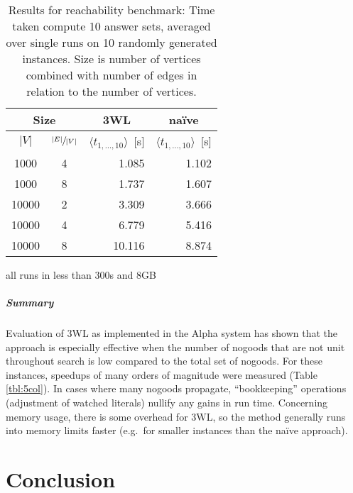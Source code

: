 \documentclass{vutinfth} %
\begin{document}
\begin{table}
	\begin{center}
	\begin{tabular}{|cc||r|r|}
\hline
\multicolumn{2}{|c||}{Size} & \multicolumn{1}{c|}{3WL} & \multicolumn{1}{c|}{na\"{i}ve} \\ 
\hline
$|V|$ & $\sfrac{|E|}{|V|}$& $\langle t_{1, \ldots, 10} \rangle$~[s]& $\langle t_{1, \ldots, 10} \rangle$~[s]\\
\hline
\hline
 1000 & 4 & 	  1.085 &	  1.102 \\
 1000 & 8 & 	  1.737 &	  1.607 \\
10000 & 2 & 	  3.309 &	  3.666 \\
10000 & 4 & 	  6.779 &	  5.416 \\
10000 & 8 & 	 10.116 &	  8.874 \\
\hline
	\end{tabular}

\hspace{3mm}

all runs in less than 300s and 8GB
	\end{center}
	\caption[Results for reachability benchmark]{Results for reachability benchmark: Time taken compute 10 answer sets, averaged over single runs on 10 randomly generated instances. Size is number of vertices combined with number of edges in relation to the number of vertices.}
	\label{tbl:reach}
\end{table}

\paragraph{Summary} Evaluation of 3WL as implemented in the Alpha system has shown that the approach is especially effective when the number of nogoods that are not unit throughout search is low compared to the total set of nogoods. For these instances, speedups of many orders of magnitude were measured (Table \ref{tbl:5col}). In cases where many nogoods propagate, \enquote{bookkeeping} operations (adjustment of watched literals) nullify any gains in run time. Concerning memory usage, there is some overhead for 3WL, so the method generally runs into memory limits faster (e.g.~for smaller instances than the na\"{i}ve approach).

\chapter{Conclusion}
\label{chap:conc}
\end{document}
